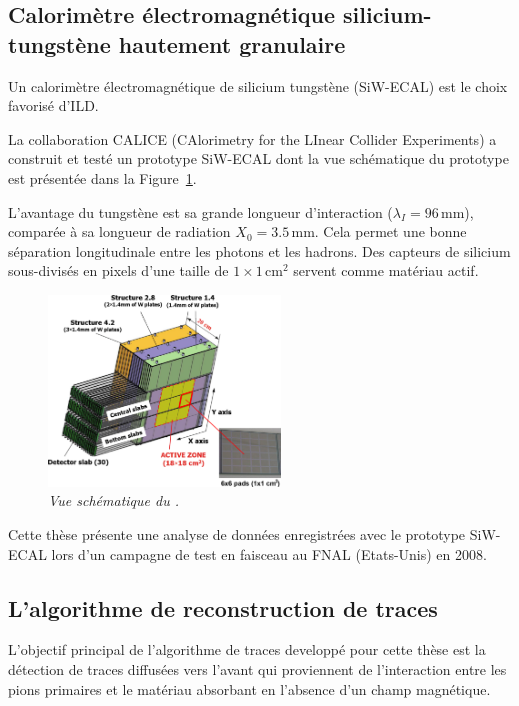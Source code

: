 \subsection*{Calorim\`etre \'electromagn\'etique silicium-tungst\`ene hautement granulaire}

Un calorim\`etre \'electromagn\'etique de silicium tungst\`ene (SiW-ECAL) est le
choix favorisé d'ILD.

La collaboration CALICE (CAlorimetry for the LInear Collider Experiments) a construit et testé un prototype SiW-ECAL dont la vue schématique du prototype est présentée dans la Figure~\ref {fig:ECAL-schemeF}.

L'avantage du tungstène est sa grande longueur d'interaction ($\lambda_I = 96$\,mm), compar\'ee \`a sa longueur de radiation  $X_0 = 3.5$\,mm. Cela permet une bonne s\'eparation longitudinale entre les photons et les hadrons. 
Des capteurs de silicium sous-divisés en pixels d'une taille de $1\times1$\,cm$^2$ servent comme mat\'eriau actif. 
\begin{figure}
	\centering
	\includegraphics[width=0.55\textwidth]{ECAL/graphics/ecal-new.png}
	\caption{\label{fig:ECAL-schemeF} \sl  Vue sch\'ematique du \ecal.}
\end{figure}

Cette thèse présente une analyse de données enregistrées avec le prototype SiW-ECAL lors d'un campagne de test en faisceau au FNAL (Etats-Unis) en 2008.  
\newpage
\subsection*{L'algorithme de reconstruction de traces}
L'objectif principal de l'algorithme de traces developpé pour cette thèse est la détection de traces diffusées vers l'avant qui proviennent de l'interaction entre les pions primaires et le matériau absorbant en l'absence d'un champ magnétique.


